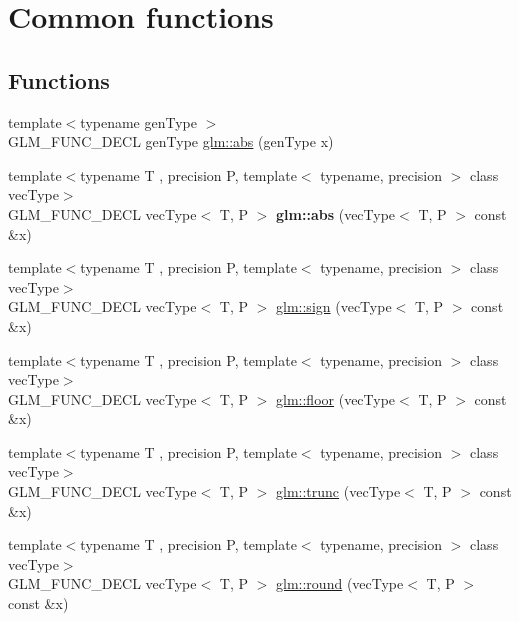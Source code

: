 \hypertarget{group__core__func__common}{}\section{Common functions}
\label{group__core__func__common}
\subsection*{Functions}
\begin{DoxyCompactItemize}
\item 
{\footnotesize template$<$typename gen\+Type $>$ }\\G\+L\+M\+\_\+\+F\+U\+N\+C\+\_\+\+D\+E\+CL gen\+Type \hyperlink{group__core__func__common_ga693d77696ff36572a0da79efec965acd}{glm\+::abs} (gen\+Type x)
\item 
\mbox{\label{group__core__func__common_ga4e8c1187dff84385308245090d440b35}} 
{\footnotesize template$<$typename T , precision P, template$<$ typename, precision $>$ class vec\+Type$>$ }\\G\+L\+M\+\_\+\+F\+U\+N\+C\+\_\+\+D\+E\+CL vec\+Type$<$ T, P $>$ {\bfseries glm\+::abs} (vec\+Type$<$ T, P $>$ const \&x)
\item 
{\footnotesize template$<$typename T , precision P, template$<$ typename, precision $>$ class vec\+Type$>$ }\\G\+L\+M\+\_\+\+F\+U\+N\+C\+\_\+\+D\+E\+CL vec\+Type$<$ T, P $>$ \hyperlink{group__core__func__common_gac3446b4138e0b8757561c07cd19f084d}{glm\+::sign} (vec\+Type$<$ T, P $>$ const \&x)
\item 
{\footnotesize template$<$typename T , precision P, template$<$ typename, precision $>$ class vec\+Type$>$ }\\G\+L\+M\+\_\+\+F\+U\+N\+C\+\_\+\+D\+E\+CL vec\+Type$<$ T, P $>$ \hyperlink{group__core__func__common_ga568b822b78f045f77c3325e165b44d5d}{glm\+::floor} (vec\+Type$<$ T, P $>$ const \&x)
\item 
{\footnotesize template$<$typename T , precision P, template$<$ typename, precision $>$ class vec\+Type$>$ }\\G\+L\+M\+\_\+\+F\+U\+N\+C\+\_\+\+D\+E\+CL vec\+Type$<$ T, P $>$ \hyperlink{group__core__func__common_ga634cdbf8b37edca03f2248450570fd54}{glm\+::trunc} (vec\+Type$<$ T, P $>$ const \&x)
\item 
{\footnotesize template$<$typename T , precision P, template$<$ typename, precision $>$ class vec\+Type$>$ }\\G\+L\+M\+\_\+\+F\+U\+N\+C\+\_\+\+D\+E\+CL vec\+Type$<$ T, P $>$ \hyperlink{group__core__func__common_gada0165544c0618d634c8056a88082ce9}{glm\+::round} (vec\+Type$<$ T, P $>$ const \&x)

\end{DoxyCompactItemize}
